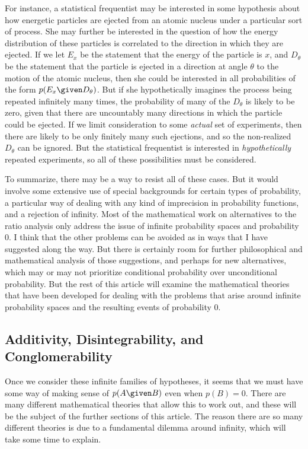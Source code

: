 For instance, a statistical frequentist may be interested in some hypothesis about how energetic particles are ejected from an atomic nucleus under a particular sort of process. She may further be interested in the question of how the energy distribution of these particles is correlated to the direction in which they are ejected. If we let $E_x$ be the statement that the energy of the particle is $x$, and $D_\theta$ be the statement that the particle is ejected in a direction at angle $\theta$ to the motion of the atomic nucleus, then she could be interested in all probabilities of the form $p(E_x \given D_\theta)$. But if she hypothetically imagines the process being repeated infinitely many times, the probability of many of the $D_\theta$ is likely to be zero, given that there are uncountably many directions in which the particle could be ejected. If we limit consideration to some \emph{actual} set of experiments, then there are likely to be only finitely many such ejections, and so the non-realized $D_\theta$ can be ignored. But the statistical frequentist is interested in \emph{hypothetically} repeated experiments, so all of these possibilities must be considered.

To summarize, there may be a way to resist all of these cases. But it would involve some extensive use of special backgrounds for certain types of probability, a particular way of dealing with any kind of imprecision in probability functions, and a rejection of infinity. Most of the mathematical work on alternatives to the ratio analysis only address the issue of infinite probability spaces and probability $0$. I think that the other problems can be avoided as in ways that I have suggested along the way. But there is certainly room for further philosophical and mathematical analysis of those suggestions, and perhaps for new alternatives, which may or may not prioritize conditional probability over unconditional probability. But the rest of this article will examine the mathematical theories that have been developed for dealing with the problems that arise around infinite probability spaces and the resulting events of probability $0$.

\subsection{Additivity, Disintegrability, and Conglomerability}\label{conglomer}

Once we consider these infinite families of hypotheses, it seems that we must have some way of making sense of $p(A \given B)$ even when $p(B)=0$. There are many different mathematical theories that allow this to work out, and these will be the subject of the further sections of this article. The reason there are so many different theories is due to a fundamental dilemma around infinity, which will take some time to explain.

